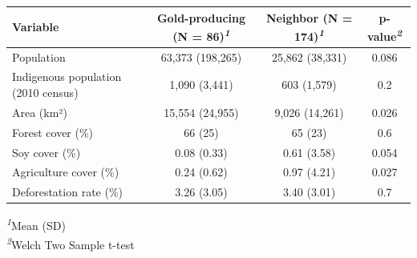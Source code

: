 {\small
\begin{tabular}{lccc}
\toprule
\textbf{Variable} & \textbf{Gold-producing} (N = 86)\textsuperscript{\textit{1}} & \textbf{Neighbor} (N = 174)\textsuperscript{\textit{1}} & \textbf{p-value}\textsuperscript{\textit{2}} \\ 
\midrule\addlinespace[2.5pt]
Population & 63,373 (198,265) & 25,862 (38,331) & 0.086 \\ 
Indigenous population (2010 census) & 1,090 (3,441) & 603 (1,579) & 0.2 \\ 
Area (km²) & 15,554 (24,955) & 9,026 (14,261) & 0.026 \\ 
Forest cover (\%) & 66 (25) & 65 (23) & 0.6 \\ 
Soy cover (\%) & 0.08 (0.33) & 0.61 (3.58) & 0.054 \\ 
Agriculture cover (\%) & 0.24 (0.62) & 0.97 (4.21) & 0.027 \\ 
Deforestation rate (\%) & 3.26 (3.05) & 3.40 (3.01) & 0.7 \\ 
\bottomrule
\end{tabular}
\begin{center}
\vspace{.05em}
\textsuperscript{\textit{1}}Mean (SD)\\
\textsuperscript{\textit{2}}Welch Two Sample t-test\\
\end{center}

}
